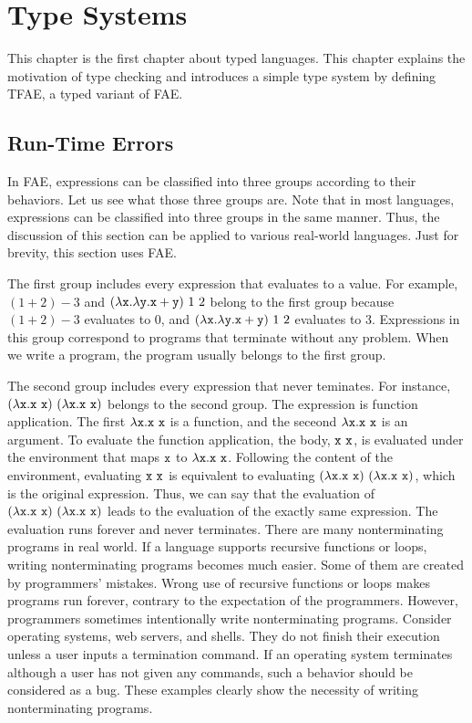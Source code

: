\setchapterpreamble[u]{\margintoc}
\chapter{Type Systems}

\renewcommand{\plang}{\textsf{FAE}\xspace}
\renewcommand{\lang}{\textsf{TFAE}\xspace}

This chapter is the first chapter about typed languages. This chapter explains
the motivation of type checking and introduces a simple type
system by defining \lang, a typed variant of \plang.

\section{Run-Time Errors}

In \plang, expressions can be classified into three groups according to their
behaviors. Let us see what those three groups are. Note that in most languages,
expressions can be classified into three groups in the same manner. Thus, the
discussion of this section can be applied to various real-world languages. Just
for brevity, this section uses \plang.

The first group includes every expression that evaluates to a value. For example,
$(1+2)-3$ and $(\lambda \cx.\lambda \cy.\cx+\cy)\ 1\ 2$ belong to the first
group because $(1+2)-3$ evaluates to $0$, and $(\lambda \texttt{x}.\lambda \texttt{y}.\texttt{x}+\texttt{y})\
1\ 2$ evaluates to $3$. Expressions in this group correspond to programs that
terminate without any problem. When we write a program, the program
usually belongs to the first group.

The second group includes every expression that never teminates. For instance,
$(\lambda \texttt{x}.\texttt{x}\ \texttt{x})\ (\lambda \texttt{x}.\texttt{x}\ \texttt{x})$ belongs to the second group.
The expression is function application. The first $\lambda \texttt{x}.\texttt{x}\ \texttt{x}$ is a
function, and the seceond $\lambda \texttt{x}.\texttt{x}\ \texttt{x}$ is an argument. To evaluate the
function application, the body, $\cx\ \cx$, is evaluated under the environment
that maps $\texttt{x}$ to $\lambda \texttt{x}.\texttt{x}\ \texttt{x}$. Following the content of the
environment, evaluating $\cx\ \cx$ is equivalent to evaluating $(\lambda
\texttt{x}.\texttt{x}\ \texttt{x})\ (\lambda \texttt{x}.\texttt{x}\ \texttt{x})$, which is the original expression. Thus,
we can say that the evaluation of $(\lambda \texttt{x}.\texttt{x}\ \texttt{x})\ (\lambda \texttt{x}.\texttt{x}\
\texttt{x})$ leads to the evaluation of the exactly same expression. The evaluation
runs forever and never terminates. There are many nonterminating programs in
real world. If a language supports recursive functions or loops, writing
nonterminating programs becomes much easier. Some of them are created by
programmers' mistakes. Wrong use of recursive functions or loops makes programs
run forever, contrary to the expectation of the programmers. However,
programmers sometimes intentionally write nonterminating programs.
Consider operating systems, web servers, and shells. They do not finish their
execution unless a user inputs a termination command. If an operating system
terminates although a user has not given any commands, such a behavior should
be considered as a bug. These examples clearly show the necessity of writing
nonterminating programs.

